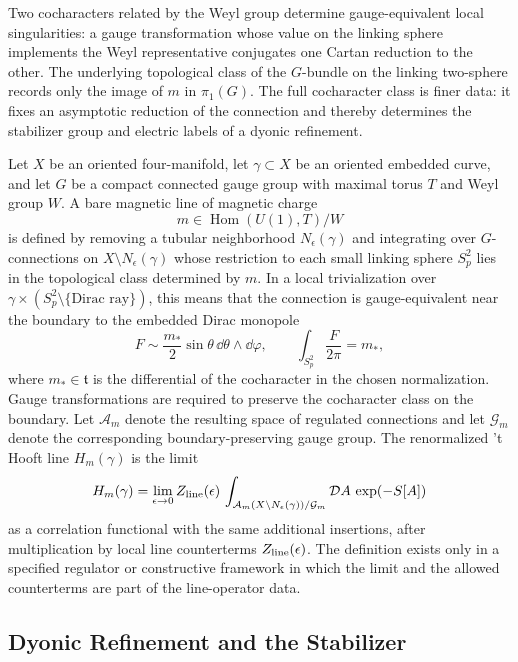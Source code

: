 Two cocharacters related by the Weyl group determine gauge-equivalent local
singularities: a gauge transformation whose value on the linking sphere
implements the Weyl representative conjugates one Cartan reduction to the
other.  The underlying topological class of the \(G\)-bundle on the linking
two-sphere records only the image of \(m\) in \(\pi_1(G)\).  The full
cocharacter class is finer data: it fixes an asymptotic reduction of the
connection and thereby determines the stabilizer group and electric labels of
a dyonic refinement.

\begin{definition}
\label{def:renormalized-thooft-line}
Let \(X\) be an oriented four-manifold, let \(\gamma\subset X\) be an oriented
embedded curve, and let \(G\) be a compact connected gauge group with maximal
torus \(T\) and Weyl group \(W\).  A bare magnetic line of magnetic charge
\[
  m\in\operatorname{Hom}(U(1),T)/W
\]
is defined by removing a tubular neighborhood \(N_\epsilon(\gamma)\) and
integrating over \(G\)-connections on \(X\setminus N_\epsilon(\gamma)\) whose
restriction to each small linking sphere \(S^2_p\) lies in the topological
class determined by \(m\).  In a local trivialization over
\(\gamma\times(S^2_p\setminus\{\text{Dirac ray}\})\), this means that the
connection is gauge-equivalent near the boundary to the embedded Dirac
monopole
\[
  F\sim \frac{m_*}{2}\sin\theta\,\dd\theta\wedge\dd\varphi ,
  \qquad
  \int_{S^2_p}\frac{F}{2\pi}=m_* ,
\]
where \(m_*\in\mathfrak t\) is the differential of the cocharacter in the
chosen normalization.  Gauge transformations are required to preserve the
cocharacter class on the boundary.  Let \(\mathcal A_m\) denote the resulting
space of regulated connections and let \(\mathcal G_m\) denote the
corresponding boundary-preserving gauge group.  The renormalized 't Hooft line
\(H_m(\gamma)\) is the limit
\[
  H_m(\gamma)
  =
  \lim_{\epsilon\to0}
  Z_{\rm line}(\epsilon)\,
  \int_{\mathcal A_m(X\setminus N_\epsilon(\gamma))/\mathcal G_m}
  \mathcal D A\,\exp(-S[A])
\]
as a correlation functional with the same additional insertions, after
multiplication by local line counterterms \(Z_{\rm line}(\epsilon)\).  The
definition exists only in a specified regulator or constructive framework in
which the limit and the allowed counterterms are part of the line-operator
data.
\end{definition}

\subsection{Dyonic Refinement and the Stabilizer}

